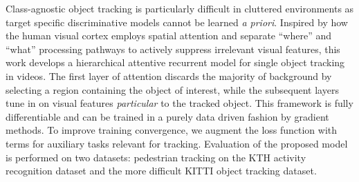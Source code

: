   Class-agnostic object tracking is particularly difficult in cluttered environments as target specific discriminative models cannot be learned \emph{a priori}. Inspired by how the human visual cortex employs spatial attention and separate ``where'' and ``what'' processing pathways to actively suppress irrelevant visual features, this work develops a hierarchical attentive recurrent model for single object tracking in videos. The first layer of attention discards the majority of background by selecting a region containing the object of interest, while the subsequent layers tune in on visual features \emph{particular} to the tracked object. 
  This framework is fully differentiable and can be trained in a purely data driven fashion by gradient methods. To improve training convergence, we augment the loss function with terms for auxiliary tasks relevant for tracking. Evaluation of the proposed model is performed on two datasets: pedestrian tracking on the KTH activity recognition dataset and the more difficult KITTI object tracking dataset.
